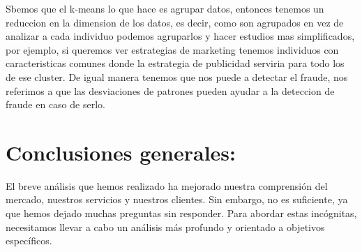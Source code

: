 \documentclass[
]{article}
\begin{document}
Sbemos que el k-means lo que hace es agrupar datos, entonces tenemos un
reduccion en la dimension de los datos, es decir, como son agrupados en
vez de analizar a cada individuo podemos agruparlos y hacer estudios mas
simplificados, por ejemplo, si queremos ver estrategias de marketing
tenemos individuos con caracteristicas comunes donde la estrategia de
publicidad serviria para todo los de ese cluster. De igual manera
tenemos que nos puede a detectar el fraude, nos referimos a que las
desviaciones de patrones pueden ayudar a la deteccion de fraude en caso
de serlo.

\section{Conclusiones generales:}\label{conclusiones-generales}

El breve análisis que hemos realizado ha mejorado nuestra comprensión
del mercado, nuestros servicios y nuestros clientes. Sin embargo, no es
suficiente, ya que hemos dejado muchas preguntas sin responder. Para
abordar estas incógnitas, necesitamos llevar a cabo un análisis más
profundo y orientado a objetivos específicos.
\end{document}
